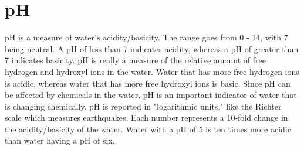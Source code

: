 \documentclass[a4paper]{article}
\begin{document}
\begin{minipage}[t]{0.45\textwidth}
\section*{\small pH}
{\normalsize pH is a measure of water's acidity/basicity. The range goes from 0 - 14, with 7 being neutral. A pH of less than 7 indicates acidity, whereas a pH of greater than 7 indicates basicity. pH is really a measure of the relative amount of free hydrogen and hydroxyl ions in the water. Water that has more free hydrogen ions is acidic, whereas water that has more free hydroxyl ions is basic. Since pH can be affected by chemicals in the water, pH is an important indicator of water that is changing chemically. pH is reported in "logarithmic units," like the Richter scale which measures earthquakes. Each number represents a 10-fold change in the acidity/basicity of the water. Water with a pH of 5 is ten times more acidic than water having a pH of six. }
\end{minipage}  
\hspace{.5cm}
\end{document}

